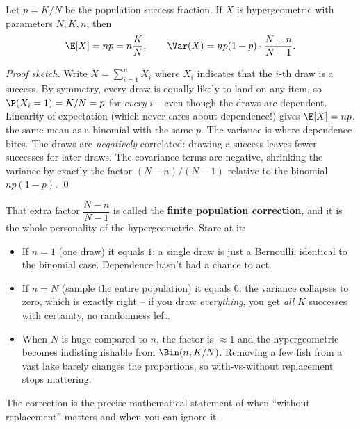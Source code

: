 \begin{proposition}
\label{ch07:hypergeom-mv}
Let $p = K/N$ be the population success fraction. If $X$ is hypergeometric with
parameters $N, K, n$, then
\[
  \E[X] = n p = n\frac{K}{N}, \qquad
  \Var(X) = n p (1-p) \cdot \frac{N-n}{N-1}.
\]
\end{proposition}

\begin{proof}[Proof sketch]
Write $X = \sum_{i=1}^{n} X_i$ where $X_i$ indicates that the $i$-th draw is a
success. By symmetry, every draw is equally likely to land on any item, so
$\P(X_i = 1) = K/N = p$ for \emph{every} $i$ -- even though the draws are
dependent. Linearity of expectation (which never cares about dependence!) gives
$\E[X] = np$, the same mean as a binomial with the same $p$. The variance is
where dependence bites. The draws are \emph{negatively} correlated: drawing a
success leaves fewer successes for later draws. The covariance terms are negative,
shrinking the variance by exactly the factor $(N-n)/(N-1)$ relative to the
binomial $np(1-p)$. \qed
\end{proof}

\begin{happeningbox}
That extra factor $\dfrac{N-n}{N-1}$ is called the \textbf{finite population
correction}, and it is the whole personality of the hypergeometric. Stare at it:
\begin{itemize}
\item If $n = 1$ (one draw) it equals $1$: a single draw is just a Bernoulli,
  identical to the binomial case. Dependence hasn't had a chance to act.
\item If $n = N$ (sample the entire population) it equals $0$: the variance
  collapses to zero, which is exactly right -- if you draw \emph{everything}, you
  get \emph{all} $K$ successes with certainty, no randomness left.
\item When $N$ is huge compared to $n$, the factor is $\approx 1$ and the
  hypergeometric becomes indistinguishable from $\Bin(n, K/N)$. Removing a few
  fish from a vast lake barely changes the proportions, so with-vs-without
  replacement stops mattering.
\end{itemize}
The correction is the precise mathematical statement of when ``without
replacement'' matters and when you can ignore it.
\end{happeningbox}

